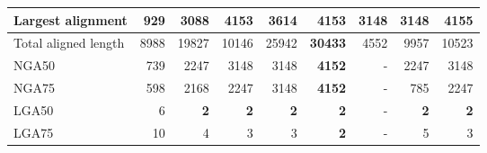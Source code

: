 \documentclass[12pt,a4paper]{article}
\begin{document}
\begin{table}[ht]
\begin{center}
\begin{tabular}{|l*{8}{|r}|}
Largest alignment & 929 & 3088 & 4153 & 3614 & 4153 & 3148 & 3148 & {\bf 4155} \\ \hline
Total aligned length & 8988 & 19827 & 10146 & 25942 & {\bf 30433} & 4552 & 9957 & 10523 \\ \hline
NGA50 & 739 & 2247 & 3148 & 3148 & {\bf 4152} & - & 2247 & 3148 \\ \hline
NGA75 & 598 & 2168 & 2247 & 3148 & {\bf 4152} & - & 785 & 2247 \\ \hline
LGA50 & 6 & {\bf 2} & {\bf 2} & {\bf 2} & {\bf 2} & - & {\bf 2} & {\bf 2} \\ \hline
LGA75 & 10 & 4 & 3 & 3 & {\bf 2} & - & 5 & 3 \\ \hline
\end{tabular}
\end{center}
\end{table}
\end{document}
